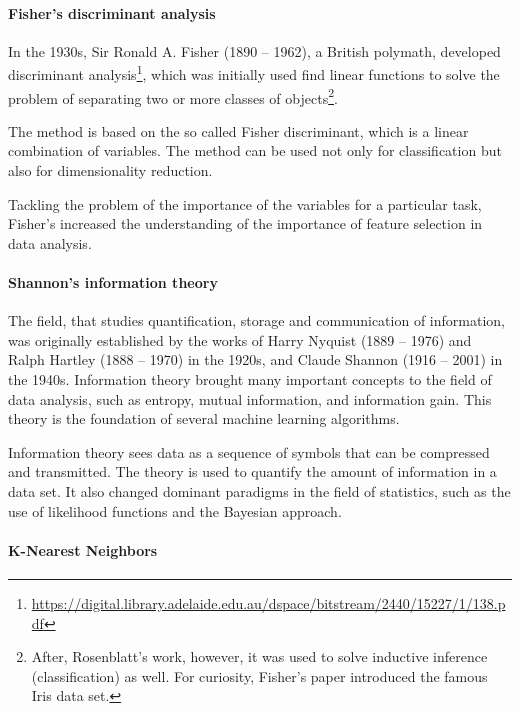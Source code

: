 \paragraph{Fisher's discriminant analysis}

In the 1930s, Sir Ronald A. Fisher (1890 -- 1962), a British polymath, developed
discriminant analysis\footnote{\url{https://digital.library.adelaide.edu.au/dspace/bitstream/2440/15227/1/138.pdf}},
which was initially used find linear functions to solve the problem of separating two or
more classes of objects\footnote{After, Rosenblatt's work, however, it was used to solve
inductive inference (classification) as well.  For curiosity, Fisher's paper
introduced the famous Iris data set.}.

The method is based on the so called Fisher discriminant, which is a linear
combination of variables.  The method can be used not only for classification but also for
dimensionality reduction.

Tackling the problem of the importance of the variables for a particular task, Fisher's
increased the understanding of the importance of feature selection in data analysis.


\paragraph{Shannon's information theory}

The field, that studies quantification, storage and communication of information, was
originally established by the works of Harry Nyquist (1889 -- 1976) and Ralph Hartley
(1888 -- 1970) in the 1920s, and Claude Shannon (1916 -- 2001) in the 1940s.
Information theory brought many important concepts to the field of data analysis, such as
entropy, mutual information, and information gain.  This theory is the foundation of
several machine learning algorithms.

Information theory sees data as a sequence of symbols that can be compressed and
transmitted.  The theory is used to quantify the amount of information in a data set.
It also changed dominant paradigms in the field of statistics, such as the use of
likelihood functions and the Bayesian approach.


\paragraph{K-Nearest Neighbors}

